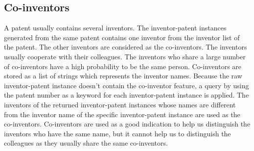 \subsection{Co-inventors}
A patent usually contains several inventors. The inventor-patent instances generated from the same patent contains one inventor from the inventor list of the patent. The other inventors are considered as the co-inventors. The inventors usually cooperate with their colleagues. The inventors who share a large number of co-inventors have a high probability to be the same person. Co-inventors are stored as a list of strings which represents the inventor names. Because the raw inventor-patent instance doesn't contain the co-inventor feature, a query by using the patent number as a keyword for each inventor-patent instance is applied. The inventors of the returned inventor-patent instances whose names are different from the inventor name of the specific inventor-patent instance are used as the co-inventors. Co-inventors are used as a good indication to help us distinguish the inventors who have the same name, but it cannot help us to distinguish the colleagues as they usually share the same co-inventors.



